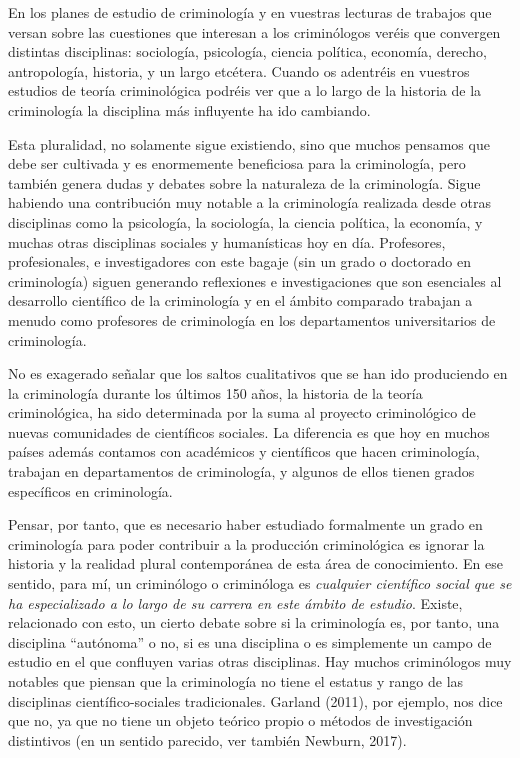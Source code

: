 \documentclass[
  spanish,
  letterpaper,
  DIV=11,
  numbers=noendperiod]{scrreprt}
\begin{document}
En los planes de estudio de criminología y en vuestras lecturas de
trabajos que versan sobre las cuestiones que interesan a los
criminólogos veréis que convergen distintas disciplinas: sociología,
psicología, ciencia política, economía, derecho, antropología, historia,
y un largo etcétera. Cuando os adentréis en vuestros estudios de teoría
criminológica podréis ver que a lo largo de la historia de la
criminología la disciplina más influyente ha ido cambiando.

Esta pluralidad, no solamente sigue existiendo, sino que muchos pensamos
que debe ser cultivada y es enormemente beneficiosa para la
criminología, pero también genera dudas y debates sobre la naturaleza de
la criminología. Sigue habiendo una contribución muy notable a la
criminología realizada desde otras disciplinas como la psicología, la
sociología, la ciencia política, la economía, y muchas otras disciplinas
sociales y humanísticas hoy en día. Profesores, profesionales, e
investigadores con este bagaje (sin un grado o doctorado en
criminología) siguen generando reflexiones e investigaciones que son
esenciales al desarrollo científico de la criminología y en el ámbito
comparado trabajan a menudo como profesores de criminología en los
departamentos universitarios de criminología.

No es exagerado señalar que los saltos cualitativos que se han ido
produciendo en la criminología durante los últimos 150 años, la historia
de la teoría criminológica, ha sido determinada por la suma al proyecto
criminológico de nuevas comunidades de científicos sociales. La
diferencia es que hoy en muchos países además contamos con académicos y
científicos que hacen criminología, trabajan en departamentos de
criminología, y algunos de ellos tienen grados específicos en
criminología.

Pensar, por tanto, que es necesario haber estudiado formalmente un grado
en criminología para poder contribuir a la producción criminológica es
ignorar la historia y la realidad plural contemporánea de esta área de
conocimiento. En ese sentido, para mí, un criminólogo o criminóloga es
\emph{cualquier científico social que se ha especializado a lo largo de
su carrera en este ámbito de estudio}. Existe, relacionado con esto, un
cierto debate sobre si la criminología es, por tanto, una disciplina
``autónoma'' o no, si es una disciplina o es simplemente un campo de
estudio en el que confluyen varias otras disciplinas. Hay muchos
criminólogos muy notables que piensan que la criminología no tiene el
estatus y rango de las disciplinas científico-sociales tradicionales.
Garland (2011), por ejemplo, nos dice que no, ya que no tiene un objeto
teórico propio o métodos de investigación distintivos (en un sentido
parecido, ver también Newburn, 2017).
\end{document}
